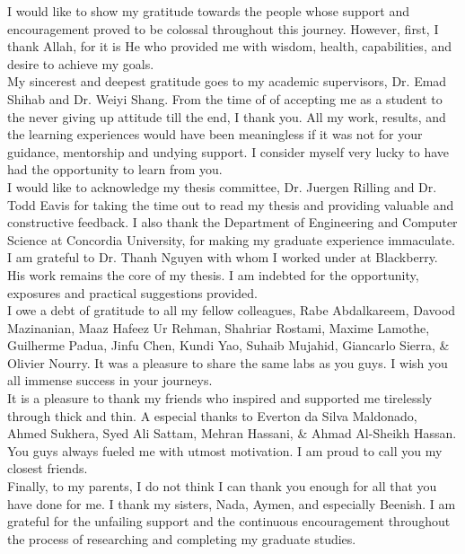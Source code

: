 \documentclass[12pt]{report}
\begin{document}
\begin{acknowledgments}

I would like to show my gratitude towards the people whose support and encouragement proved to be colossal throughout this journey. However, first, I thank Allah, for it is He who provided me with wisdom, health, capabilities, and desire to achieve my goals.
\\

My sincerest and deepest gratitude goes to my academic supervisors, Dr. Emad Shihab and Dr. Weiyi Shang. From the time of of accepting me as a student to the never giving up attitude till the end, I thank you. All my work, results, and the learning experiences would have been meaningless if it was not for your guidance, mentorship and undying support. I consider myself very lucky to have had the opportunity to learn from you.
\\

I would like to acknowledge my thesis committee, Dr. Juergen Rilling and Dr. Todd Eavis for taking the time out to read my thesis and providing valuable and constructive feedback. I also thank the Department of Engineering and Computer Science at Concordia University, for making my graduate experience immaculate.
\\

I am grateful to Dr. Thanh Nguyen with whom I worked under at Blackberry. His work remains the core of my thesis. I am indebted for the opportunity, exposures and practical suggestions provided. 
\\

I owe a debt of gratitude to all my fellow colleagues, 
Rabe Abdalkareem, Davood Mazinanian, Maaz Hafeez Ur Rehman, Shahriar Rostami, Maxime Lamothe, Guilherme Padua, Jinfu Chen, Kundi Yao, Suhaib Mujahid, Giancarlo Sierra, \& Olivier Nourry. It was a pleasure to share the same labs as you guys. I wish you all immense success in your journeys. 
\\

It is a pleasure to thank my friends who inspired and supported me tirelessly through thick and thin. A especial thanks to Everton da Silva Maldonado, Ahmed Sukhera, Syed Ali Sattam, Mehran Hassani, \& Ahmad Al-Sheikh Hassan. You guys always fueled me with utmost motivation. I am proud to call you my closest friends. 
\\

Finally, to my parents, I do not think I can thank you enough for all that you have done for me. I thank my sisters, Nada, Aymen, and especially Beenish. I am grateful for the unfailing support and the continuous encouragement throughout the process of researching and completing my graduate studies. 





\end{acknowledgments}
\end{document}
